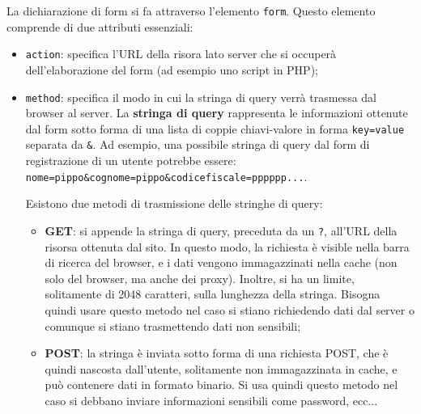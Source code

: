 \documentclass[a4paper,11pt]{article}
\begin{document}
La dichiarazione di form si fa attraverso l'elemento \lstinline|form|.
Questo elemento comprende di due attributi essenziali:
\begin{itemize}
	\item \lstinline|action|: specifica l'URL della risora lato server che si occuperà dell'elaborazione del form (ad esempio uno script in PHP);
	\item \lstinline|method|: specifica il modo in cui la stringa di query verrà trasmessa dal browser al server.
		La \textbf{stringa di query} rappresenta le informazioni ottenute dal form sotto forma di una lista di coppie chiavi-valore in forma \lstinline|key=value| separata da \lstinline|&|.
		Ad esempio, una possibile stringa di query dal form di registrazione di un utente potrebbe essere:
		\lstinline|nome=pippo&cognome=pippo&codicefiscale=pppppp...|.

		Esistono due metodi di trasmissione delle stringhe di query:
		\begin{itemize}
			\item \textbf{GET}: si appende la stringa di query, preceduta da un \lstinline|?|, all'URL della risorsa ottenuta dal sito. 
			In questo modo, la richiesta è visible nella barra di ricerca del browser, e i dati vengono immagazzinati nella cache (non solo del browser, ma anche dei proxy). Inoltre, si ha un limite, solitamente di 2048 caratteri, sulla lunghezza della stringa. Bisogna quindi usare questo metodo nel caso si stiano richiedendo dati dal server o comunque si stiano trasmettendo dati non sensibili;
		\item \textbf{POST}: la stringa è inviata sotto forma di una richiesta POST, che è quindi nascosta dall'utente, solitamente non immagazzinata in cache, e può contenere dati in formato binario. Si usa quindi questo metodo nel caso si debbano inviare informazioni sensibili come password, ecc...
		\end{itemize}
\end{itemize}
\end{document}
